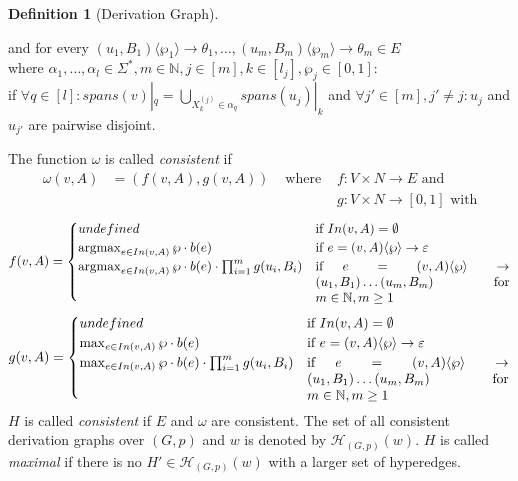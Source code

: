 \documentclass{tudscrartcl}
\theoremstyle{definition}
\newtheorem{definition}{Definition}[section]
\DeclareMathOperator*{\argmax}{argmax}
\begin{document}
\begin{definition}[Derivation Graph]
\begin{itemize}
			and for every $(u_1, B_1)\langle \wp_1 \rangle \to \theta_1,
			\ldots, (u_m, B_m)\langle \wp_m \rangle \to \theta_m \in E$\\
			where $\alpha_1, \ldots, \alpha_l \in \Sigma^*, m \in \mathbb{N},
			j \in [m], k \in [l_j], \wp_j \in [0, 1]:$\\
			if $\forall q \in [l]:
			spans(v)|_q = \bigcup_{X_k^{(j)} \in \alpha_q} spans(u_j)|_k$
			and $\forall j' \in [m], j' \neq j: u_j$ and $u_{j'}$ are pairwise disjoint.
	\end{itemize}
	The function $\omega$ is called \emph{consistent} if
	\begin{align*}
		\omega(v, A) &= (f(v, A), g(v, A)) & \text{ where }
		&f: V \times N \to E \text{ and }\\
		&&&g: V \times N \to [0, 1] \text { with}
	\end{align*}
	\begin{align*}
		f(v, A) = 
		\begin{cases}
			undefined & \text{if } In(v, A) = \emptyset \\
			\argmax_{e \in In(v, A)} \wp \cdot b(e)
			& \parbox[t]{.43\textwidth}{
				if $e = (v, A)\langle \wp \rangle \to \varepsilon$}\\
			\argmax_{e \in In(v, A)}
			\wp \cdot b(e) \cdot \prod^{m}_{i = 1} g(u_i, B_i)
			& \parbox[t]{.43\textwidth}{
				if $e = (v, A)\langle \wp \rangle \to (u_1, B_1) 
				\ldots (u_m, B_m)$ for $m \in \mathbb{N}, m \geq 1$}
		\end{cases}
	\end{align*}
	\begin{align*}
		g(v, A) = 
		\begin{cases}
			undefined & \text{if } In(v, A) = \emptyset \\
			\max_{e \in In(v, A)} \wp \cdot b(e)
			& \parbox[t]{.43\textwidth}{
				if $e = (v, A)\langle \wp \rangle \to \varepsilon$}\\
			\max_{e \in In(v, A)}
			\wp \cdot b(e) \cdot \prod^{m}_{i = 1} g(u_i, B_i)
			& \parbox[t]{.43\textwidth}{
				if $e = (v, A)\langle \wp \rangle \to (u_1, B_1) 
				\ldots (u_m, B_m)$ for $m \in \mathbb{N}, m \geq 1$}
		\end{cases}
	\end{align*}
	$H$ is called \emph{consistent} if $E$ and $\omega$ are consistent.
	The set of all consistent derivation graphs over $(G, p)$ and $w$ is denoted by
	$\mathcal{H}_{(G, p)}(w)$.
	$H$ is called \emph{maximal} if there is no $H' \in \mathcal{H}_{(G, p)}(w)$ with
	a larger set of hyperedges.
\end{definition}
\end{document}
